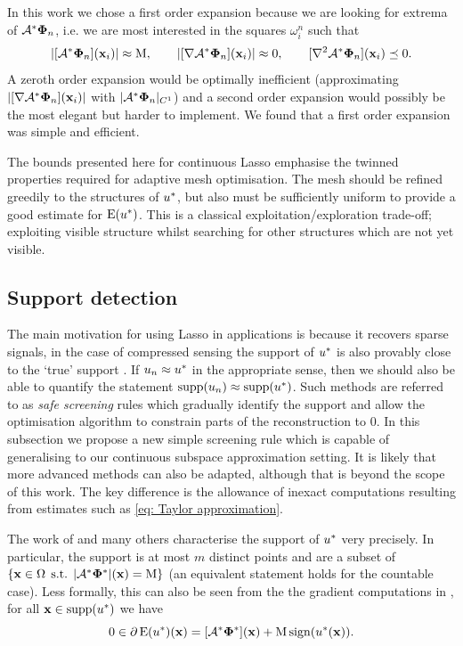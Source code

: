 \documentclass[10pt,a4paper,onecolumn]{article}
\numberwithin{equation}{section}
\newcommand{\op}[1]{\operatorname{#1}}\newcommand{\overtext}[2]{\stackrel{\text{#1}}{#2}}
\DeclareMathOperator{\st}{\;s.t.\;}\DeclareMathOperator{\as}{\;a.s.\;}\renewcommand{\epsilon}{\varepsilon}
\renewcommand{\vec}{\mathbf}
\newcommand{\UCmath}[1]{%
	\begingroup
	\ucmathlist\uppercase\expandafter{#1}%
	\endgroup
}
\newcommand{\ucmathlist}{%
	\def\alpha{\mathrm{A}}%
	\def\beta{\mathrm{B}}%
	\let\gamma=\Gamma
	\let\delta=\Delta
	\def\epsilon{\mathrm{E}}%
	\def\varepsilon{\mathrm{E}}%
	\def\zeta{\mathrm{Z}}%
	\def\eta{\mathrm{H}}%
	\let\theta=\Theta
	\let\vartheta=\Theta
	\def\iota{\mathrm{I}}%
	\def\kappa{\mathrm{K}}%
	\let\lambda=\Lambda
	\def\mu{\mathrm{M}}%
	\def\nu{\mathrm{N}}%
	\let\xi=\Xi
	\let\pi=\Pi
	\let\varpi=\Pi
	\def\rho{\mathrm{P}}%
	\def\varrho{\mathrm{P}}%
	\let\sigma=\Sigma
	\def\tau{\mathrm{T}}%
	\let\upsilon=\Upsilon
	\let\phi=\Phi
	\let\varphi=\Phi
	\def\chi{\mathrm{X}}%
	\let\psi=\Psi
	\let\omega=\Omega
}
\newcommand{\caps}[1]{\UCmath{#1}}
\newcommand*{\Func}[1]{%
	\IfEqCase{#1}{%
		{0}{\op{E}}%
		{1}{\op{F}}%
		{2}{\op{G}}%
		{3}{\op{H}}%
	}[\op{F}#1]%
}
\newcommand*{\varf}[1]{%
	\IfEqCase{#1}{%
		{0}{u}%
		{1}{v}%
		{2}{w}%
	}[u#1]%
}
\newcommand*{\vard}[1]{%
	\IfEqCase{#1}{%
		{0}{\varphi}%
		{1}{\psi}%
	}[\varphi #1]%
}
\newcommand*{\varx}[1]{%
	\IfEqCase{#1}{%
		{0}{x}%
		{1}{y}%
		{2}{z}%
		{3}{r}%
	}[x#1]%
}
\newcommand*{\data}[1]{%
	\IfEqCase{#1}{%
		{0}{\eta}%
		{1}{\nu}%
	}[g]%
}
\newcommand{\Domain}{\Omega}
\newcommand{\domain}{\omega}
\newcommand*{\Varx}[1]{\caps{\varx{#1}}}
\newcommand*{\vvarx}[1]{\vec{\varx{#1}}}\newcommand*{\vVarx}[1]{\vec{\Varx{#1}}}
\newcommand*{\vvard}[1]{\vec{\vard{#1}}}\newcommand*{\vdata}[1]{\vec{\data{#1}}}
\begin{document}
In this work we chose a first order expansion because we are looking for extrema of $\A^*\vvard0_n$, i.e. we are most interested in the squares $\domain_i^n$ such that 
\begin{equation}
	|[\A^*\vvard0_n](\vvarx0_i)| \approx \mu, \qquad |[\nabla\A^*\vvard0_n](\vvarx0_i)| \approx 0, \qquad [\nabla^2\A^*\vvard0_n](\vvarx0_i) \preceq 0. 
\end{equation}
A zeroth order expansion would be optimally inefficient (approximating $|[\nabla\A^*\vvard0_n](\vvarx0_i)|$ with $|\A^*\vvard0_n|_{C^1}$) and a second order expansion would possibly be the most elegant but harder to implement. We found that a first order expansion was simple and efficient.

The bounds presented here for continuous Lasso emphasise the twinned properties required for adaptive mesh optimisation. The mesh should be refined greedily to the structures of $\varf0^*$, but also must be sufficiently uniform to provide a good estimate for $\Func0(\varf0^*)$. This is a classical exploitation/exploration trade-off; exploiting visible structure whilst searching for other structures which are not yet visible.



\subsection{Support detection}\label{sec: support detection}
The main motivation for using Lasso in applications is because it recovers sparse signals, in the case of compressed sensing the support of $\varf0^*$ is also provably close to the `true' support \citep{Duval2017a,Poon2018}. If $\varf0_n\approx \varf0^*$ in the appropriate sense, then we should also be able to quantify the statement $\op{supp}(\varf0_n)\approx\op{supp}(\varf0^*)$. Such methods are referred to as \emph{safe screening} rules \citep{ElGhaoui2010} which gradually identify the support and allow the optimisation algorithm to constrain parts of the reconstruction to 0. In this subsection we propose a new simple screening rule which is capable of generalising to our continuous subspace approximation setting. It is likely that more advanced methods \citep{Bonnefoy2015,Ndiaye2017} can also be adapted, although that is beyond the scope of this work. The key difference is the allowance of inexact computations resulting from estimates such as \eqref{eq: Taylor approximation}.

The work of \citep{Duval2017a,Poon2018} and many others characterise the support of $\varf0^*$ very precisely. In particular, the support is at most $m$ distinct points and are a subset of $\{ \vvarx0\in\Domain \st |\A^*\vvard0^*|(\vvarx0) = \mu\} $ (an equivalent statement holds for the countable case). Less formally, this can also be seen from the the gradient computations in , for all $\vvarx0\in\supp(\varf0^*)$ we have
\begin{equation}
	0\in \partial \Func0(\varf0^*)(\vvarx0) = [\A^*\vvard0^*](\vvarx0) + \mu\sign(\varf0^*(\vvarx0)).
\end{equation}
\end{document}

